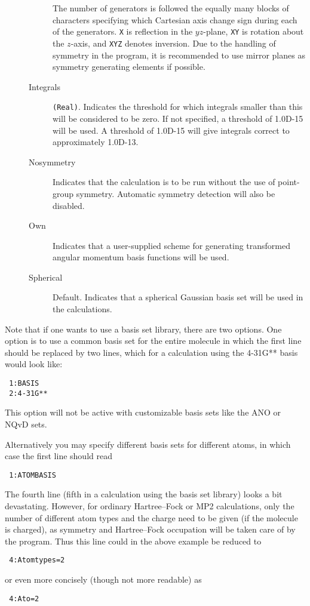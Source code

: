 \begin{description}
\begin{description}
The number of generators is followed the
equally many blocks of characters specifying which Cartesian axis
change sign during each of the generators. {\tt X}
is reflection
in the \mbox{$yz$-plane}, {\tt XY} is rotation about
the \mbox{$z$-axis},
and {\tt XYZ} denotes inversion. Due to the handling
of symmetry in
the program, it is recommended to use mirror planes as symmetry
generating elements if possible.
\item[Integrals] \verb|(Real)|. Indicates the threshold for which
  integrals smaller than this will be considered to be zero. If not
  specified, a threshold of 1.0D-15 will be used. A threshold
of 1.0D-15 will give integrals correct to approximately 1.0D-13.
\item[Nosymmetry] Indicates that the calculation is to be run without
  the use of point-group symmetry. Automatic symmetry detection will
  also be disabled.
\item[Own] Indicates that a user-supplied scheme for generating
  transformed angular momentum basis functions will be used.
\item[Spherical] Default. Indicates that a spherical Gaussian basis
  set will be used in the calculations.
\end{description}
\end{description}

Note that if one wants to use a basis set
library, there are two
options. One option is to use a common basis set for the entire
molecule in which the first line should be replaced by two lines,
which for a calculation using the 4-31G** basis would look like:
\begin{verbatim}
 1:BASIS
 2:4-31G**
\end{verbatim}
This option will not be active with customizable basis sets like the
ANO or NQvD sets.


Alternatively you may specify different basis sets for different
atoms, in which case the first line should read
\begin{verbatim}
 1:ATOMBASIS
\end{verbatim}

The fourth line (fifth in a calculation using the basis set library)
looks a bit devastating. However, for ordinary
Hartree--Fock
or MP2 calculations, only the number of different atom types and the charge
need to be given (if the molecule is charged), as symmetry and
Hartree--Fock occupation
will be taken care of by the program. Thus
this line could in the above example be reduced to
\begin{verbatim}
 4:Atomtypes=2
\end{verbatim}
or even more concisely (though not more readable) as
\begin{verbatim}
 4:Ato=2
\end{verbatim}


